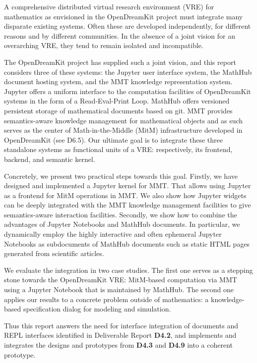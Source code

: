 A comprehensive distributed virtual research environment (VRE) for mathematics as envisioned in the OpenDreamKit project must integrate many disparate existing systems.
Often these are developed independently, for different reasons and by different communities.
In the absence of a joint vision for an overarching VRE, they tend to remain isolated and incompatible.

The OpenDreamKit project has supplied such a joint vision, and this report considers three of these systems: the Jupyter user interface system, the MathHub document hosting system, and the MMT knowledge representation system.
Jupyter offers a uniform interface to the computation facilities of OpenDreamKit systems in the form of a Read-Eval-Print Loop.
MathHub offers versioned persistent storage of mathematical documents based on git.
MMT provides semantics-aware knowledge management for mathematical objects and as such serves as the center of Math-in-the-Middle (MitM) infrastructure developed in OpenDreamKit (see D6.5).
Our ultimate goal is to integrate these three standalone systems as functional units of a VRE: respectively, its frontend, backend, and semantic kernel.

Concretely, we present two practical steps towards this goal.
Firstly, we have designed and implemented a Jupyter kernel for MMT.
That allows using Jupyter as a frontend for MitM operations in MMT.
We also show how Jupyter widgets can be deeply integrated with the MMT knowledge management facilities to give semantics-aware interaction facilities.
Secondly, we show how to combine the advantages of Jupyter Notebooks and MathHub documents.
In particular, we dynamically employ the highly interactive and often ephemeral Jupyter Notebooks as subdocuments of MathHub documents such as static HTML pages generated from scientific articles.

We evaluate the integration in two case studies.
The first one serves as a stepping stone towards the OpenDreamKit VRE: MitM-based computation via MMT using a Jupyter Notebook that is maintained by MathHub.
The second one applies our results to a concrete problem outside of mathematics: a knowledge-based specification dialog for modeling and simulation.

Thus this report answers the need for interface integration of documents and REPL interfaces identified in Deliverable Report \textbf{D4.2}, and implements and integrates the designs and prototypes from \textbf{D4.3} and \textbf{D4.9} into a coherent prototype. 


